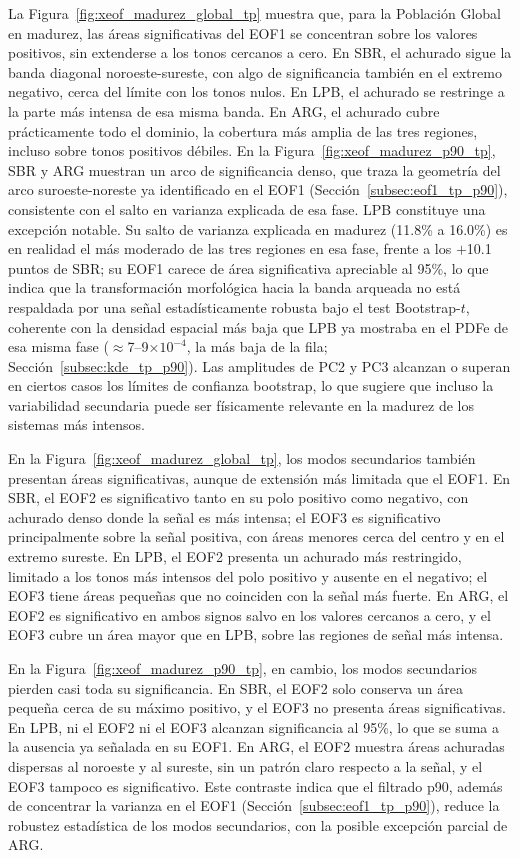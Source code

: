 La Figura~\ref{fig:xeof_madurez_global_tp} muestra que, para la Población Global en madurez, las áreas significativas del EOF1 se concentran sobre los valores positivos, sin extenderse a los tonos cercanos a cero. En SBR, el achurado sigue la banda diagonal noroeste-sureste, con algo de significancia también en el extremo negativo, cerca del límite con los tonos nulos. En LPB, el achurado se restringe a la parte más intensa de esa misma banda. En ARG, el achurado cubre prácticamente todo el dominio, la cobertura más amplia de las tres regiones, incluso sobre tonos positivos débiles.
En la Figura~\ref{fig:xeof_madurez_p90_tp}, SBR y ARG muestran un arco de significancia denso, que traza la geometría del arco suroeste-noreste ya identificado en el EOF1 (Sección~\ref{subsec:eof1_tp_p90}), consistente con el salto en varianza explicada de esa fase. LPB constituye una excepción notable. Su salto de varianza explicada en madurez (11.8\% a 16.0\%) es en realidad el más moderado de las tres regiones en esa fase, frente a los $+$10.1 puntos de SBR; su EOF1 carece de área significativa apreciable al 95\%, lo que indica que la transformación morfológica hacia la banda arqueada no está respaldada por una señal estadísticamente robusta bajo el test Bootstrap-$t$, coherente con la densidad espacial más baja que LPB ya mostraba en el PDFe de esa misma fase (${\approx}$7--9$\times10^{-4}$, la más baja de la fila; Sección~\ref{subsec:kde_tp_p90}). Las amplitudes de PC2 y PC3 alcanzan o superan en ciertos casos los límites de confianza bootstrap, lo que sugiere que incluso la variabilidad secundaria puede ser físicamente relevante en la madurez de los sistemas más intensos.

En la Figura~\ref{fig:xeof_madurez_global_tp}, los modos secundarios también presentan áreas significativas, aunque de extensión más limitada que el EOF1. En SBR, el EOF2 es significativo tanto en su polo positivo como negativo, con achurado denso donde la señal es más intensa; el EOF3 es significativo principalmente sobre la señal positiva, con áreas menores cerca del centro y en el extremo sureste. En LPB, el EOF2 presenta un achurado más restringido, limitado a los tonos más intensos del polo positivo y ausente en el negativo; el EOF3 tiene áreas pequeñas que no coinciden con la señal más fuerte. En ARG, el EOF2 es significativo en ambos signos salvo en los valores cercanos a cero, y el EOF3 cubre un área mayor que en LPB, sobre las regiones de señal más intensa.

En la Figura~\ref{fig:xeof_madurez_p90_tp}, en cambio, los modos secundarios pierden casi toda su significancia. En SBR, el EOF2 solo conserva un área pequeña cerca de su máximo positivo, y el EOF3 no presenta áreas significativas. En LPB, ni el EOF2 ni el EOF3 alcanzan significancia al 95\%, lo que se suma a la ausencia ya señalada en su EOF1. En ARG, el EOF2 muestra áreas achuradas dispersas al noroeste y al sureste, sin un patrón claro respecto a la señal, y el EOF3 tampoco es significativo. Este contraste indica que el filtrado p90, además de concentrar la varianza en el EOF1 (Sección~\ref{subsec:eof1_tp_p90}), reduce la robustez estadística de los modos secundarios, con la posible excepción parcial de ARG.

